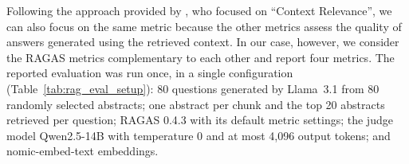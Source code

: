 \documentclass[bdcc,article,submit,pdftex,moreauthors]{Definitions/mdpi}
\newif\ifshowchanges
\newcommand{\commentRed}[1]{\textcolor{red}{#1}}
\newif\ifshowchanges
\begin{document}
Following the approach provided by  \citet{aytar2024retrieval}, who focused on ``Context Relevance'', we can also focus on the same metric because the other metrics assess the quality of answers generated using the retrieved context. In our case, however, we consider the RAGAS metrics complementary to each other and report four metrics. 
The reported evaluation was run once, in a single configuration (Table~\ref{tab:rag_eval_setup}): 80 questions generated by Llama~3.1 from 80 randomly selected abstracts; one abstract per chunk and the top 20 abstracts retrieved per question; RAGAS 0.4.3 with its default metric settings; the judge model Qwen2.5-14B with temperature 0 and at most 4,096 output tokens; and nomic-embed-text embeddings.


\end{document}
